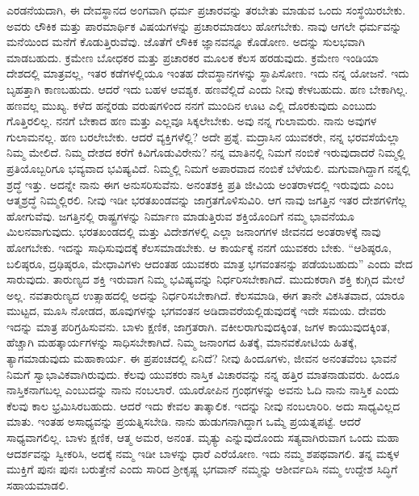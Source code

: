 \vskip 3pt

ಎರಡನೆಯದಾಗಿ, ಈ ದೇವಸ್ಥಾನದ ಅಂಗವಾಗಿ ಧರ್ಮ ಪ್ರಚಾರವನ್ನು ತರಬೇತು ಮಾಡುವ ಒಂದು ಸಂಸ್ಥೆಯಿರಬೇಕು. ಅವರು ಲೌಕಿಕ ಮತ್ತು ಪಾರಮಾರ್ಥಿಕ ವಿಷಯಗಳನ್ನು ಪ್ರಚಾರಮಾಡಲು ಹೋಗಬೇಕು. ನಾವು ಆಗಲೇ ಧರ್ಮವನ್ನು ಮನೆಯಿಂದ ಮನೆಗೆ ಕೊಡುತ್ತಿರುವೆವು. ಜೊತೆಗೆ ಲೌಕಿಕ ಜ್ಞಾನವನ್ನೂ ಕೊಡೋಣ. ಅದನ್ನು ಸುಲಭವಾಗಿ ಮಾಡಬಹುದು. ಕ್ರಮೇಣ ಬೋಧಕರ ಮತ್ತು ಪ್ರಚಾರಕರ ಮೂಲಕ ಕೆಲಸ ಹರಡುವುದು. ಕ್ರಮೇಣ ಇಂಡಿಯಾ ದೇಶದಲ್ಲಿ ಮಾತ್ರವಲ್ಲ, ಇತರ ಕಡೆಗಳಲ್ಲಿಯೂ ಇಂತಹ ದೇವಸ್ಥಾನಗಳನ್ನು ಸ್ಥಾಪಿಸೋಣ. ಇದು ನನ್ನ ಯೋಜನೆ. ಇದು ಬೃಹತ್ತಾಗಿ ಕಾಣಬಹುದು. ಆದರೆ ಇದು ಬಹಳ ಆವಶ್ಯಕ. ಹಣವೆಲ್ಲಿದೆ ಎಂದು ನೀವು ಕೇಳಬಹುದು. ಹಣ ಬೇಕಾಗಿಲ್ಲ. ಹಣವಲ್ಲ ಮುಖ್ಯ. ಕಳೆದ ಹನ್ನೆರಡು ವರುಷಗಳಿಂದ ನನಗೆ ಮುಂದಿನ ಊಟ ಎಲ್ಲಿ ದೊರಕುವುದು ಎಂಬುದು ಗೊತ್ತಿರಲಿಲ್ಲ. ನನಗೆ ಬೇಕಾದ ಹಣ ಮತ್ತು ಎಲ್ಲವೂ ಸಿಕ್ಕಲೇಬೇಕು. ಅವು ನನ್ನ ಗುಲಾಮರು. ನಾನು ಅವುಗಳ ಗುಲಾಮನಲ್ಲ. ಹಣ ಬರಲೇಬೇಕು. ಆದರೆ ವ್ಯಕ್ತಿಗಳೆಲ್ಲಿ? ಅದೇ ಪ್ರಶ್ನೆ. ಮದ್ರಾಸಿನ ಯುವಕರೇ, ನನ್ನ ಭರವಸೆಯೆಲ್ಲಾ ನಿಮ್ಮ ಮೇಲಿದೆ. ನಿಮ್ಮ ದೇಶದ ಕರೆಗೆ ಕಿವಿಗೊಡುವಿರೇನು? ನನ್ನ ಮಾತಿನಲ್ಲಿ ನಿಮಗೆ ನಂಬಿಕೆ ಇರುವುದಾದರೆ ನಿಮ್ಮಲ್ಲಿ ಪ್ರತಿಯೊಬ್ಬರಿಗೂ ಭವ್ಯವಾದ ಭವಿಷ್ಯವಿದೆ. ನಿಮ್ಮಲ್ಲಿ ನಿಮಗೆ ಅಪಾರವಾದ ನಂಬಿಕೆ ಬೆಳೆಯಲಿ. ಮಗುವಾಗಿದ್ದಾಗ ನನ್ನಲ್ಲಿ ಶ್ರದ್ಧೆ ಇತ್ತು. ಅದನ್ನೇ ನಾನು ಈಗ ಅನುಸರಿಸುವೆನು. ಅನಂತಶಕ್ತಿ ಪ್ರತಿ ಜೀವಿಯ ಅಂತರಾಳದಲ್ಲಿ ಇರುವುದು ಎಂಬ ಆತ್ಮಶ್ರದ್ಧೆ ನಿಮ್ಮಲ್ಲಿರಲಿ. ನೀವು ಇಡೀ ಭರತಖಂಡವನ್ನು ಜಾಗ್ರತಗೊಳಿಸುವಿರಿ. ಆಗ ನಾವು ಜಗತ್ತಿನ ಇತರ ದೇಶಗಳಿಗೆಲ್ಲ ಹೋಗುವೆವು. ಜಗತ್ತಿನಲ್ಲಿ ರಾಷ್ಟ್ರಗಳನ್ನು ನಿರ್ಮಾಣ ಮಾಡುತ್ತಿರುವ ಶಕ್ತಿಯೊಂದಿಗೆ ನಮ್ಮ ಭಾವನೆಯೂ ಮಿಲನವಾಗುವುದು. ಭರತಖಂಡದಲ್ಲಿ ಮತ್ತು ವಿದೇಶಗಳಲ್ಲಿ ಎಲ್ಲಾ ಜನಾಂಗಗಳ ಜೀವನದ ಅಂತರಾಳಕ್ಕೆ ನಾವು ಹೋಗಬೇಕು. ಇದನ್ನು ಸಾಧಿಸುವುದಕ್ಕೆ ಕೆಲಸಮಾಡಬೇಕು. ಆ ಕಾರ್ಯಕ್ಕೆ ನನಗೆ ಯುವಕರು ಬೇಕು. “ಆಶಿಷ್ಠರೂ, ಬಲಿಷ್ಠರೂ, ದ್ರಢಿಷ್ಠರೂ, ಮೇಧಾವಿಗಳು ಆದಂತಹ ಯುವಕರು ಮಾತ್ರ ಭಗವಂತನನ್ನು ಪಡೆಯಬಹುದು” ಎಂದು ವೇದ ಸಾರುವುದು. ತಾರುಣ್ಯದ ಶಕ್ತಿ ಇರುವಾಗ ನಿಮ್ಮ ಭವಿಷ್ಯವನ್ನು ನಿರ್ಧರಿಸಬೇಕಾಗಿದೆ. ಮುದುಕರಾಗಿ ಶಕ್ತಿ ಕುಗ್ಗಿದ ಮೇಲೆ ಅಲ್ಲ. ನವತಾರುಣ್ಯದ ಉತ್ಸಾಹದಲ್ಲಿ ಅದನ್ನು ನಿರ್ಧರಿಸಬೇಕಾಗಿದೆ. ಕೆಲಸಮಾಡಿ, ಈಗ ತಾನೇ ವಿಕಸಿತವಾದ, ಯಾರೂ ಮುಟ್ಟದ, ಮೂಸಿ ನೋಡದ, ಹೂವುಗಳನ್ನು ಭಗವಂತನ ಅಡಿದಾವರೆಯಲ್ಲಿಡುವುದಕ್ಕೆ ಇದೇ ಸಮಯ. ದೇವರು ಇದನ್ನು ಮಾತ್ರ ಪರಿಗ್ರಹಿಸುವನು. ಬಾಳು ಕ್ಷಣಿಕ, ಜಾಗ್ರತರಾಗಿ. ವಕೀಲರಾಗುವುದಕ್ಕಿಂತ, ಜಗಳ ಕಾಯುವುದಕ್ಕಿಂತ, ಹೆಚ್ಚಾಗಿ ಮಹತ್ಕಾರ್ಯಗಳನ್ನು ಸಾಧಿಸಬೇಕಾಗಿದೆ. ನಿಮ್ಮ ಜನಾಂಗದ ಹಿತಕ್ಕೆ, ಮಾನವಕೋಟಿಯ ಹಿತಕ್ಕೆ, ತ್ಯಾಗಮಾಡುವುದು ಮಹಾಕಾರ್ಯ. ಈ ಪ್ರಪಂಚದಲ್ಲಿ ಏನಿದೆ? ನೀವು ಹಿಂದೂಗಳು, ಜೀವನ ಅನಂತವೆಂಬ ಭಾವನೆ ನಿಮಗೆ ಸ್ವಾಭಾವಿಕವಾಗಿರುವುದು. ಕೆಲವು ಯುವಕರು ನಾಸ್ತಿಕ ವಿಚಾರವನ್ನು ನನ್ನ ಹತ್ತಿರ ಮಾತನಾಡುವರು. ಹಿಂದೂ ನಾಸ್ತಿಕನಾಗಬಲ್ಲ ಎಂಬುದನ್ನು ನಾನು ನಂಬಲಾರೆ. ಯೂರೋಪಿನ ಗ್ರಂಥಗಳನ್ನು ಅವನು ಓದಿ ನಾನು ನಾಸ್ತಿಕ ಎಂದು ಕೆಲವು ಕಾಲ ಭ್ರಮಿಸಿರಬಹುದು. ಆದರೆ ಇದು ಕೇವಲ ತಾತ್ಕಾಲಿಕ. ಇದನ್ನು ನೀವು ನಂಬಲಾರಿರಿ. ಅದು ಸಾಧ್ಯವಿಲ್ಲದ ಮಾತು. ಇಂತಹ ಅಸಾಧ್ಯವನ್ನು ಪ್ರಯತ್ನಿಸಬೇಡಿ. ನಾನು ಹುಡುಗನಾಗಿದ್ದಾಗ ಒಮ್ಮೆ ಪ್ರಯತ್ನಪಟ್ಟೆ. ಆದರೆ ಸಾಧ್ಯವಾಗಲಿಲ್ಲ. ಬಾಳು ಕ್ಷಣಿಕ, ಆತ್ಮ ಅಮರ, ಅನಂತ. ಮೃತ್ಯು ಎನ್ನುವುದೊಂದು ಸತ್ಯವಾಗಿರುವಾಗ ಒಂದು ಮಹಾ ಆದರ್ಶವನ್ನು ಸ್ವೀಕರಿಸಿ, ಅದಕ್ಕೆ ನಮ್ಮ ಇಡೀ ಬಾಳನ್ನು ಧಾರೆ ಎರೆಯೋಣ. ಇದು ನಮ್ಮ ಶಪಥವಾಗಲಿ. ತನ್ನ ಮಕ್ಕಳ ಮುಕ್ತಿಗೆ ಪುನಃ ಪುನಃ ಬರುತ್ತೇನೆ ಎಂದು ಸಾರಿದ ಶ‍್ರೀಕೃಷ್ಣ ಭಗವಾನ್​ ನಮ್ಮನ್ನು ಆಶೀರ್ವದಿಸಿ ನಮ್ಮ ಉದ್ದೇಶ ಸಿದ್ಧಿಗೆ ಸಹಾಯಮಾಡಲಿ.

